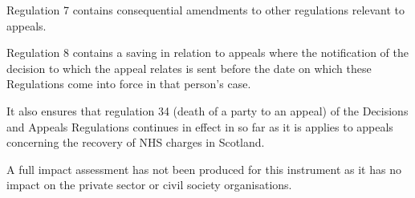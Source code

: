 \documentclass[12pt,a4paper]{article}
\begin{document}
Regulation 7 contains consequential amendments to other regulations relevant to appeals.

Regulation 8 contains a saving in relation to appeals where the notification of the decision to which the appeal relates is sent before the date on which these Regulations come into force in that person’s case.

It also ensures that regulation 34 (death of a party to an appeal) of the Decisions and Appeals Regulations continues in effect in so far as it is applies to appeals concerning the recovery of NHS charges in Scotland.

A full impact assessment has not been produced for this instrument as it has no impact on the private sector or civil society organisations. 
\end{document}
